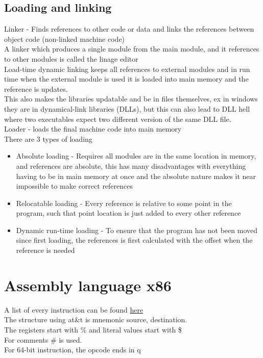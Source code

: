 \documentclass[12pt, a4paper]{article}
\begin{document}
		\subsection{Loading and linking}
			Linker - Finds references to other code or data and links the references between object code (non-linked machine code)\\
			A linker which produces a single module from the main module, and it references to other modules is called the linage editor\\
			Load-time dynamic linking keeps all references to external modules and in run time when the external module is used it is loaded into main memory and the reference is updates.\\
			This also makes the libraries updatable and be in files themselves, ex in windows they are in dynamical-link libraries (DLLs), but this can also lead to DLL hell where two executables expect two different version of the same DLL file.\\[4mm]
			Loader - loads the final machine code into main memory \\
			There are 3 types of loading
			\begin{itemize}
				\item Absolute loading - Requires all modules are in the same location in memory, and references are absolute, this has many disadvantages with everything having to be in main memory at once and the absolute nature makes it near impossible to make correct references
				\item Relocatable loading - Every reference is relative to some point in the program, such that point location is just added to every other reference
				\item Dynamic run-time loading - To ensure that the program has not been moved since first loading, the references is first calculated with the offset when the reference is needed
			\end{itemize}
	\section{Assembly language x86}
		A list of every instruction can be found \href{https://www.felixcloutier.com/x86/}{here}\\
		The structure using at\&t is mnemonic source, destination.\\
		The registers start with \% and literal values start with \$\\
		For comments \# is used.\\
		For 64-bit instruction, the opcode ends in q
\end{document}
